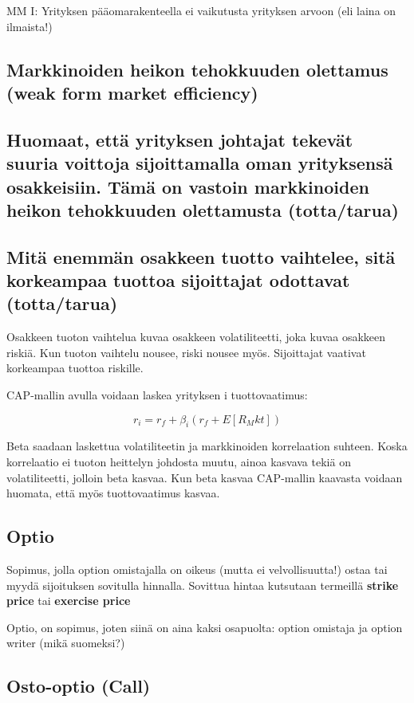 \documentclass[a4paper]{article}
\begin{document}
MM I: Yrityksen pääomarakenteella ei vaikutusta yrityksen arvoon (eli laina on ilmaista!)



\subsection{Markkinoiden heikon tehokkuuden olettamus (weak form market efficiency)}

\subsection{Huomaat, että yrityksen johtajat tekevät suuria voittoja sijoittamalla oman yrityksensä osakkeisiin. Tämä on vastoin markkinoiden heikon tehokkuuden olettamusta (totta/tarua)}

\subsection{Mitä enemmän osakkeen tuotto vaihtelee, sitä korkeampaa tuottoa sijoittajat odottavat (totta/tarua)}

Osakkeen tuoton vaihtelua kuvaa osakkeen volatiliteetti, joka kuvaa osakkeen riskiä. Kun tuoton vaihtelu nousee, riski nousee myös. Sijoittajat vaativat korkeampaa tuottoa riskille.

CAP-mallin avulla voidaan laskea yrityksen i tuottovaatimus:

\[
    r_i = r_f + \beta_i (r_f + E[R_Mkt])
\]

Beta saadaan laskettua volatiliteetin ja markkinoiden korrelaation suhteen. Koska korrelaatio ei tuoton heittelyn johdosta muutu, ainoa kasvava tekiä on volatiliteetti, jolloin beta kasvaa. Kun beta kasvaa CAP-mallin kaavasta voidaan huomata, että myös tuottovaatimus kasvaa.

\subsection{Optio}

Sopimus, jolla option omistajalla on oikeus (mutta ei velvollisuutta!) ostaa tai myydä sijoituksen sovitulla hinnalla. Sovittua hintaa kutsutaan termeillä \textbf{strike price} tai \textbf{exercise price}

Optio, on sopimus, joten siinä on aina kaksi osapuolta: option omistaja ja option writer (mikä suomeksi?)

\subsection{Osto-optio (Call)}
\end{document}
